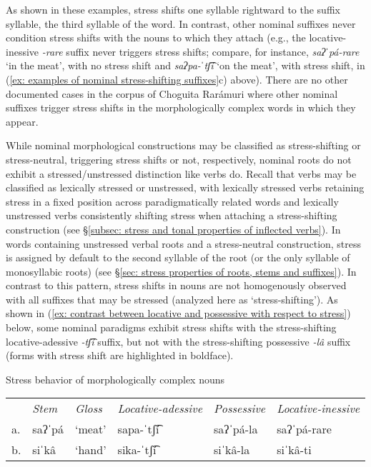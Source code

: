As shown in these examples, stress shifts one syllable rightward to the suffix syllable, the third syllable of the word. In contrast, other nominal suffixes never condition stress shifts with the nouns to which they attach (e.g., the locative-inessive \textit{-rare} suffix never triggers stress shifts; compare, for instance, \textit{saʔˈpá-rare} `in the meat', with no stress shift and \textit{saʔpa-ˈtʃ͡í} `on the meat', with stress shift, in (\ref{ex: examples of nominal stress-shifting suffixes}c) above). There are no other documented cases in the corpus of Choguita Rarámuri where other nominal suffixes trigger stress shifts in the morphologically complex words in which they appear.

While nominal morphological constructions may be classified as stress-shif\-ting or stress-neutral, triggering stress shifts or not, respectively, nominal roots do not exhibit a stressed/unstressed distinction like verbs do. Recall that verbs may be classified as lexically stressed or unstressed, with lexically stressed verbs retaining stress in a fixed position across paradigmatically related words and lexically unstressed verbs consistently shifting stress when attaching a stress-shifting construction (see §\ref{subsec: stress and tonal properties of inflected verbs}). In words containing unstressed verbal roots and a stress-neutral construction, stress is assigned by default to the second syllable of the root (or the only syllable of monosyllabic roots) (see §\ref{sec: stress properties of roots, stems and suffixes}). In contrast to this pattern, stress shifts in nouns are not homogenously observed with all suffixes that may be stressed (analyzed here as `stress-shifting'). As shown in (\ref{ex: contrast between locative and possessive with respect to stress}) below, some nominal paradigms exhibit stress shifts with the stress-shifting locative-adessive \textit{-tʃ͡í} suffix, but not with the stress-shifting possessive \textit{-lâ} suffix (forms with stress shift are highlighted in boldface).

\ea\label{ex: contrast between locative and possessive with respect to stress}
{Stress behavior of morphologically complex nouns}

\begin{tabular}{llllll}
       & \textit{Stem} & \textit{Gloss} & \textit{Locative-adessive} & \textit{Possessive} & \textit{Locative-inessive}\\
     a.& saʔˈpá & `meat' &  sapa-ˈtʃ͡í  & saʔˈpá-la & saʔˈpá-rare \\
     b.&  siˈkâ & `hand' & sika-ˈtʃ͡í & siˈkâ-la & siˈkâ-ti \\
\end{tabular}
    \z

